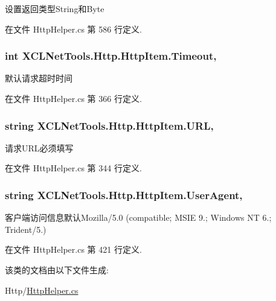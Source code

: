 设置返回类型\-String和\-Byte 



在文件 Http\-Helper.\-cs 第 586 行定义.

\hypertarget{class_x_c_l_net_tools_1_1_http_1_1_http_item_a916fc3ebf5e0a663cd007e016cb9628a}{
\subsubsection[{Timeout}]{\setlength{\rightskip}{0pt plus 5cm}int X\-C\-L\-Net\-Tools.\-Http.\-Http\-Item.\-Timeout\hspace{0.3cm}{\ttfamily [get]}, {\ttfamily [set]}}}\label{class_x_c_l_net_tools_1_1_http_1_1_http_item_a916fc3ebf5e0a663cd007e016cb9628a}


默认请求超时时间 



在文件 Http\-Helper.\-cs 第 366 行定义.

\hypertarget{class_x_c_l_net_tools_1_1_http_1_1_http_item_a7936af55970113dd94765443dadd47f7}{
\subsubsection[{U\-R\-L}]{\setlength{\rightskip}{0pt plus 5cm}string X\-C\-L\-Net\-Tools.\-Http.\-Http\-Item.\-U\-R\-L\hspace{0.3cm}{\ttfamily [get]}, {\ttfamily [set]}}}\label{class_x_c_l_net_tools_1_1_http_1_1_http_item_a7936af55970113dd94765443dadd47f7}


请求\-U\-R\-L必须填写 



在文件 Http\-Helper.\-cs 第 344 行定义.

\hypertarget{class_x_c_l_net_tools_1_1_http_1_1_http_item_a25ea4f4ea5d663ecb0d235eaf5d63469}{
\subsubsection[{User\-Agent}]{\setlength{\rightskip}{0pt plus 5cm}string X\-C\-L\-Net\-Tools.\-Http.\-Http\-Item.\-User\-Agent\hspace{0.3cm}{\ttfamily [get]}, {\ttfamily [set]}}}\label{class_x_c_l_net_tools_1_1_http_1_1_http_item_a25ea4f4ea5d663ecb0d235eaf5d63469}


客户端访问信息默认\-Mozilla/5.0 (compatible; M\-S\-I\-E 9.; Windows N\-T 6.; Trident/5.) 



在文件 Http\-Helper.\-cs 第 421 行定义.



该类的文档由以下文件生成\-:\begin{DoxyCompactItemize}
\item 
Http/\hyperlink{_http_helper_8cs}{Http\-Helper.\-cs}\end{DoxyCompactItemize}
